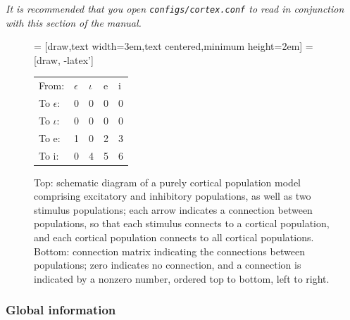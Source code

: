 \documentclass[12pt,a4paper]{article}
\newcommand{\type}[1]{{\small\small\tt #1} }
\begin{document}
{\em It is recommended that you open \type{configs/cortex.conf} to read in conjunction with this section of the manual.}
\vspace{24pt}

\begin{figure}[h!]
\begin{center}
 = [draw,text width=3em,text centered,minimum height=2em]
 = [draw, -latex']
\end{center}
\vspace{0.2cm}
\begin{center}
\begin{tabular}{ l l l l l }
    From:& $\epsilon$ & $\iota$ & e & i \\
    To $\epsilon$:& 0 & 0 & 0 & 0 \\
    To $\iota$:& 0 & 0 & 0 & 0 \\
    To e:& 1 & 0 & 2 & 3 \\
    To i:& 0 & 4 & 5 & 6
\end{tabular}
\end{center}
\caption{Top: schematic diagram of a purely cortical population model comprising excitatory and inhibitory populations, as well as two stimulus populations; each arrow indicates a connection between populations, so that each stimulus connects to a cortical population, and each cortical population connects to all cortical populations. Bottom: connection matrix indicating the connections between populations; zero indicates no connection, and a connection is indicated by a nonzero number, ordered top to bottom, left to right.}
\label{fig:cortical}
\end{figure}

\clearpage


\subsubsection{Global information}
\label{sec:global}
\end{document}
